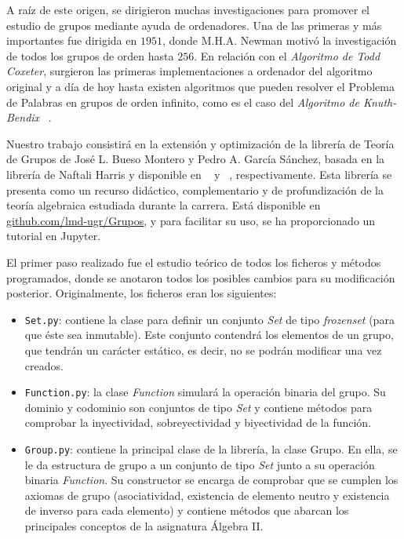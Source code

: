 A raíz de este origen, se dirigieron muchas investigaciones para promover el estudio de grupos mediante ayuda de ordenadores. 
Una de las primeras y más importantes fue dirigida en $1951$, donde M.H.A. Newman motivó la investigación de todos los grupos de orden hasta $256$. En relación con el \textit{Algoritmo de Todd Coxeter}, surgieron las primeras implementaciones a ordenador del algoritmo original y a día de hoy hasta existen algoritmos que pueden resolver el Problema de Palabras en grupos de orden infinito, como es el caso del \textit{Algoritmo de Knuth-Bendix} ~\cite{knuth}.




Nuestro trabajo consistirá en la extensión y optimización de la librería de Teoría de Grupos de José L. Bueso Montero y Pedro A. García Sánchez, basada en la librería de Naftali Harris y disponible en ~\cite{Pedrito} y ~\cite{Absalg}, respectivamente. Esta librería se presenta como un recurso didáctico, complementario y de profundización de la teoría algebraica estudiada durante la carrera. Está disponible en \href{https://github.com/lmd-ugr/Grupos}{github.com/lmd-ugr/Grupos},  y para facilitar su uso, se ha proporcionado un tutorial en Jupyter.


El primer paso realizado fue el estudio teórico de todos los ficheros y métodos programados, donde se anotaron todos los posibles cambios para su modificación posterior. Originalmente, los ficheros eran los siguientes:

\begin{itemize}
    \item \texttt{Set.py}: contiene la clase para definir un conjunto \textit{Set} de tipo \textit{frozenset} (para que éste sea inmutable). Este conjunto contendrá los elementos de un grupo, que tendrán un carácter estático, es decir, no se podrán modificar una vez creados.
    
    \item \texttt{Function.py}: la clase \textit{Function} simulará la operación binaria del grupo. Su dominio y codominio son conjuntos de tipo \textit{Set} y contiene métodos para comprobar la inyectividad, sobreyectividad y biyectividad de la función.
    
    \item \texttt{Group.py}: contiene la principal clase de la librería, la clase Grupo. En ella, se le da estructura de grupo a un conjunto de tipo \textit{Set} junto a su operación binaria \textit{Function}. Su constructor se encarga de comprobar que se cumplen los axiomas de grupo (asociatividad, existencia de elemento neutro y existencia de inverso para cada elemento) y contiene métodos que abarcan los principales conceptos de la asignatura Álgebra II.
\end{itemize}

